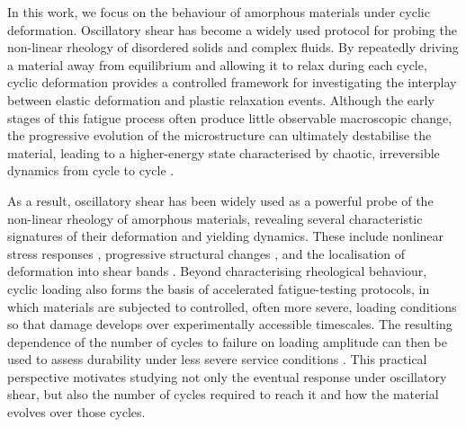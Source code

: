 In this work, we focus on the behaviour of amorphous materials under cyclic deformation. Oscillatory shear has become a widely used protocol for probing the non-linear rheology of disordered solids and complex fluids. By repeatedly driving a material away from equilibrium and allowing it to relax during each cycle, cyclic deformation provides a controlled framework for investigating the interplay between elastic deformation and plastic relaxation events. 
Although the early stages of this fatigue process often produce little observable macroscopic change, the progressive evolution of the microstructure can ultimately destabilise the material, leading to a higher-energy state characterised by chaotic, irreversible dynamics from cycle to cycle \cite{Regev_onset_2013,pineChaosThresholdIrreversibility2005,Das2020}.

As a result, oscillatory shear has been widely used as a powerful probe of the non-linear rheology of amorphous materials, revealing several characteristic signatures of their deformation and yielding dynamics. These include nonlinear stress responses \cite{yoshimuraResponseElasticBingham1987a,ewoldtLargeAmplitudeOscillatory2010,renouYieldingProcessesColloidal2010,rogersSequencePhysicalProcesses2012,blackwellSimpleThixotropicViscoelastic2014}, progressive structural changes \cite{Koumakis2013,Poulos2013,Poulos2015,vandoornStrandPlasticityGoverns2018}, and the localisation of deformation into shear bands \cite{radhakrishnan_shear_2016,radhakrishnan_shear_2018,rogersAgingYieldingShear2008,yehGlassStabilityChanges2020,Parmar2019}. Beyond characterising rheological behaviour, cyclic loading also forms the basis of accelerated fatigue-testing protocols, in which materials are subjected to controlled, often more severe, loading conditions so that damage develops over experimentally accessible timescales. The resulting dependence of the number of cycles to failure on loading amplitude can then be used to assess durability under less severe service conditions \cite{BasquinTheEL,Suresh1998,DowlingMechanical2013}. This practical perspective motivates studying not only the eventual response under oscillatory shear, but also the number of cycles required to reach it and how the material evolves over those cycles.

